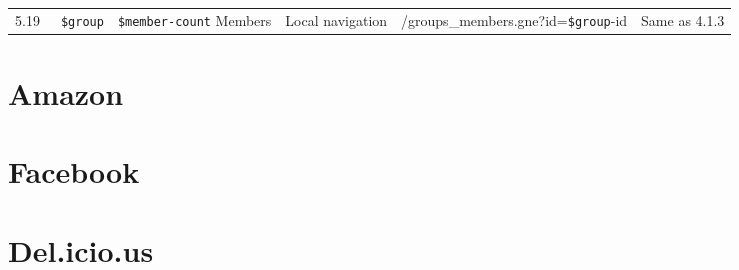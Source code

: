 \documentclass[11pt,a4paper]{article}
\newcommand{\var}[1]{\texttt{\${#1}}}
\begin{document}
\begin{landscape}
\begin{table}[h!b!p!]
\begin{center}
\begin{tiny}
\begin{tabular}{r|l|l|l|l|p{3cm}}
              5.19 &
              ~\var{group}  &
              \var{member-count} Members &
              Local navigation &
              /groups\_members.gne?id=\var{group}-id &
              Same as 4.1.3 \\

          \end{tabular}
        \rm
      \end{tiny}
    \end{center}
  \end{table}
\end{landscape}

\section{Amazon}

\section{Facebook}

\section{Del.icio.us}
\end{document}
